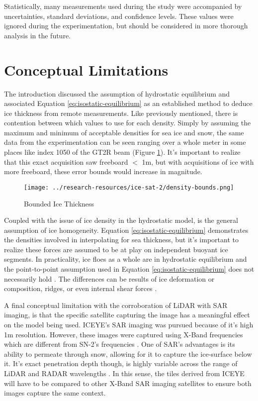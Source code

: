 Statistically, many measurements used during the study were accompanied by uncertainties, standard deviations, and confidence levels. These values were ignored during the experimentation, but should be considered in more thorough analysis in the future. 

\section{Conceptual Limitations}
The introduction discussed the assumption of hydrostatic equilibrium and associated Equation \ref{eq:isostatic-equilibrium} as an established method to deduce ice thickness from remote measurements. Like previously mentioned, there is contention between which values to use for each density. Simply by assuming the maximum and minimum of acceptable densities for sea ice and snow, the same data from the experimentation can be seen ranging over a whole meter in some places like index 1050 of the GT2R beam (Figure \ref{fig:density-bounds}). It's important to realize that this exact acquisition saw freeboard $<$ 1m, but with acquisitions of ice with more freeboard, these error bounds would increase in magnitude.

\begin{figure}[h]
	\centering
	\texttt{[image: ../research-resources/ice-sat-2/density-bounds.png]}
	\caption[Effect of Density Estimations on Ice Thickness Interpolation]{Bounded Ice Thickness}
	\label{fig:density-bounds}
\end{figure}

Coupled with the issue of ice density in the hydrostatic model, is the general assumption of ice homogeneity. Equation \ref{eq:isostatic-equilibrium} demonstrates the densities involved in interpolating for sea thickness, but it's important to realize these forces are assumed to be at play on independent buoyant ice segments. In practicality, ice floes as a whole are in hydrostatic equilibrium and the point-to-point assumption used in Equation \ref{eq:isostatic-equilibrium} does not necessarily hold \cite{Forsström_Gerland_Pedersen_2011}. The differences can be results of ice deformation or composition, ridges, or even  internal shear forces \cite{Hutchings_Heil_Lecomte_Stevens_Steer_Lieser_2015,sea-ice-properties}. 

A final conceptual limitation with the corroboration of LiDAR with SAR imaging, is that the specific satellite capturing the image has a meaningful effect on the model being used. ICEYE's SAR imaging was pursued because of it's high 1m resolution. However, these images were captured using X-Band frequencies which are different from SN-2's frequencies \cite{iceye-products,Sentinel-2-Availability}. One of SAR's advantages is its ability to permeate through snow, allowing for it to capture the ice-surface below it. It's exact penetration depth though, is highly variable across the range of LiDAR and RADAR wavelengths \cite{remotesensingkinematics}. In this sense, the tiles derived from ICEYE will have to be compared to other X-Band SAR imaging satellites to ensure both images capture the same context.


